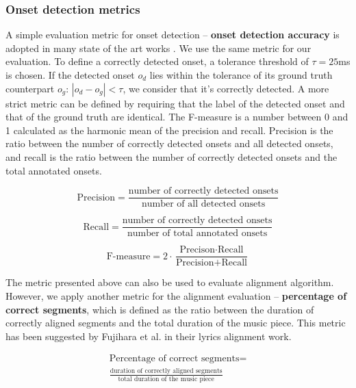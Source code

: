 \subsubsection{Onset detection metrics}

A simple evaluation metric for onset detection -- \textbf{onset detection accuracy} is adopted in many state of the art works . We use the same metric for our evaluation. To define a correctly detected onset, a tolerance threshold of $\tau=25$ms is chosen. If the detected onset $o_d$ lies within the tolerance of its ground truth counterpart $o_g$: $|o_d-o_g|<\tau$, we consider that it's correctly detected. A more strict metric can be defined by requiring that the label of the detected onset and that of the ground truth are identical. The F-measure is a number between 0 and 1 calculated as the harmonic mean of the precision and recall. Precision is the ratio between the number of correctly detected onsets and all detected onsets, and recall is the ratio between the number of correctly detected onsets and the total annotated onsets.

\begin{equation}
\textrm{Precision} = \frac{\textrm{number of correctly detected onsets}}{\textrm{number of all detected onsets}}
\end{equation}

\begin{equation}
\textrm{Recall} = \frac{\textrm{number of correctly detected onsets}}{\textrm{number of total annotated onsets}}
\end{equation}

\begin{equation}
\textrm{F-measure} = 2 \cdot \frac{\textrm{Precison} \cdot \textrm{Recall}}{\textrm{Precision} + \textrm{Recall}}
\end{equation}

The metric presented above can also be used to evaluate alignment algorithm. However, we apply another metric for the alignment evaluation -- \textbf{percentage of correct segments}, which is defined as the ratio between the duration of correctly aligned segments and the total duration of the music piece. This metric has been suggested by Fujihara et al.  in their lyrics alignment work.

\begin{equation}
\begin{split}
\textrm{Percentage of correct segments} =\\\frac{\textrm{duration of correctly aligned segments}}{\textrm{total duration of the music piece}}
\end{split}
\end{equation}

